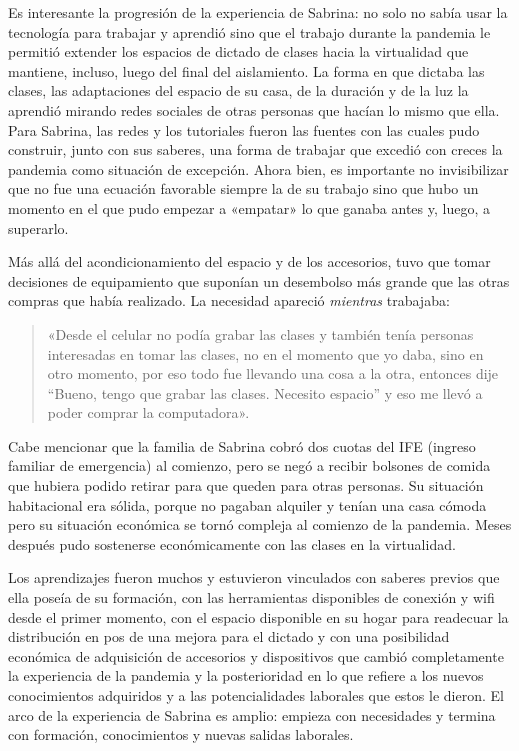 Es interesante la progresión de la experiencia de Sabrina: no solo no sabía usar la tecnología para trabajar y aprendió sino que el trabajo durante la pandemia le permitió extender los espacios de dictado de clases hacia la virtualidad que mantiene, incluso, luego del final del aislamiento. La forma en que dictaba las clases, las adaptaciones del espacio de su casa, de la duración y de la luz la aprendió mirando redes sociales de otras personas que hacían lo mismo que ella. Para Sabrina, las redes y los tutoriales fueron las fuentes con las cuales pudo construir, junto con sus saberes, una forma de trabajar que excedió con creces la pandemia como situación de excepción. Ahora bien, es importante no invisibilizar que no fue una ecuación favorable siempre la de su trabajo sino que hubo un momento en el que pudo empezar a «empatar» lo que ganaba antes y, luego, a superarlo.

Más allá del acondicionamiento del espacio y de los accesorios, tuvo que tomar decisiones de equipamiento que suponían un desembolso más grande que las otras compras que había realizado. La necesidad apareció \emph{mientras} trabajaba:

\begin{quote}
«Desde el celular no podía grabar las clases y también tenía personas interesadas en tomar las clases, no en el momento que yo daba, sino en otro momento, por eso todo fue llevando una cosa a la otra, entonces dije ``Bueno, tengo que grabar las clases. Necesito espacio'' y eso me llevó a poder comprar la computadora».
\end{quote}

Cabe mencionar que la familia de Sabrina cobró dos cuotas del IFE (ingreso familiar de emergencia) al comienzo, pero se negó a recibir bolsones de comida que hubiera podido retirar para que queden para otras personas. Su situación habitacional era sólida, porque no pagaban alquiler y tenían una casa cómoda pero su situación económica se tornó compleja al comienzo de la pandemia. Meses después pudo sostenerse económicamente con las clases en la virtualidad.

Los aprendizajes fueron muchos y estuvieron vinculados con saberes previos que ella poseía de su formación, con las herramientas disponibles de conexión y wifi desde el primer momento, con el espacio disponible en su hogar para readecuar la distribución en pos de una mejora para el dictado y con una posibilidad económica de adquisición de accesorios y dispositivos que cambió completamente la experiencia de la pandemia y la posterioridad en lo que refiere a los nuevos conocimientos adquiridos y a las potencialidades laborales que estos le dieron. El arco de la experiencia de Sabrina es amplio: empieza con necesidades y termina con formación, conocimientos y nuevas salidas laborales.


